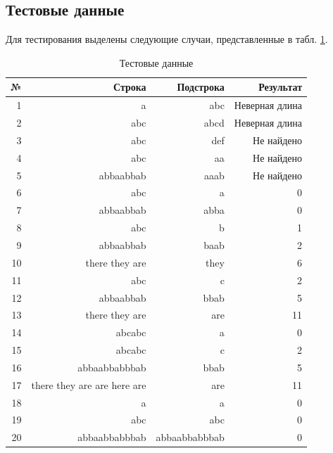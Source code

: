 \documentclass[a4paper,12pt]{article}
\begin{document}
\subsection{Тестовые данные}
\label{fig:test_data}

Для тестирования выделены следующие случаи, представленные в табл. \ref{test0}.

\begin{table} [h!]
	\begin{center}
		\caption{Тестовые данные}
		\begin{tabular}{|r|r|r|r|}
			\hline
			№ &     Строка &  Подстрока &  Результат \\
			\hline
			1 &          a &        abc &  Неверная длина \\
			\hline
			2 &        abc &       abcd &  Неверная длина \\
			\hline
			3 &        abc &        def &  Не найдено \\
			\hline
			4 &        abc &         aa &  Не найдено \\
			\hline
			5 &  abbaabbab &       aaab &  Не найдено \\
			\hline
			6 &        abc &          a &          0 \\
			\hline
			7 &  abbaabbab &       abba &          0 \\
			\hline
			8 &        abc &          b &          1 \\
			\hline
			9 &  abbaabbab &       baab &          2 \\
			\hline
			10 & there they are &       they &          6 \\
			\hline
			11 &        abc &          c &          2 \\
			\hline
			12 &  abbaabbab &       bbab &          5 \\
			\hline
			13 & there they are &        are &         11 \\
			\hline
			14 &     abcabc &          a &          0 \\
			\hline
			15 &     abcabc &          c &          2 \\
			\hline
			16 & abbaabbabbbab &       bbab &          5 \\
			\hline
			17 & there they are are here are &        are &         11 \\
			\hline
			18 &          a &          a &          0 \\
			\hline
			19 &        abc &        abc &          0 \\
			\hline
			20 & abbaabbabbbab & abbaabbabbbab &          0 \\
			\hline
		\end{tabular} 
		
		\label{test0}
	\end{center}
\end{table}
\end{document}
